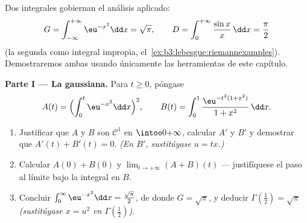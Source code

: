 \begin{problem}
\label{pb:b3:lebesgue:1}
Dos integrales gobiernan el análisis aplicado:
\[
G = \int_{-\infty}^{+\infty}\eu^{-x^2}\dd x = \sqrt\pi,
\qquad
D = \int_0^{+\infty}\frac{\sin x}{x}\,\dd x = \frac\pi2
\]
(la segunda como integral impropia,
el~\cref{ex:b3:lebesgue:riemannexamples}). Demostraremos ambas usando
únicamente las herramientas de este capítulo.

\medskip
\noindent\textbf{Parte I --- La gaussiana.} Para $t \geq 0$, póngase
\[
A(t) = \Bigl(\int_0^t\eu^{-x^2}\dd x\Bigr)^{2},
\qquad
B(t) = \int_0^1\frac{\eu^{-t^2(1 + x^2)}}{1 + x^2}\,\dd x .
\]
\begin{enumerate}
  \item Justificar que $A$ y $B$ son $\mathcal C^1$ en
  $\intoo0{+\infty}$, calcular $A'$ y $B'$ y demostrar que
  $A'(t) + B'(t) = 0$. \emph{(En $B'$, sustitúyase $u =
        tx$.)} \item Calcular $A(0) + B(0)$ y
  $\lim_{t\to+\infty}(A + B)(t)$ --- justifíquese el paso al límite bajo
  la integral en $B$. \item Concluir $\int_0^\infty \eu^{-x^2}\dd x =
        \frac{\sqrt\pi}2$, de donde $G = \sqrt\pi$, y deducir
  $\Gamma(\tfrac12) = \sqrt\pi$ \emph{(sustitúyase $x =
        u^2$ en $\Gamma(\frac12)$)}.
\end{enumerate}


\end{problem}
